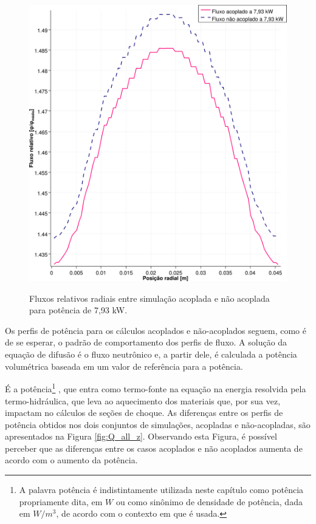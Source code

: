 \begin{figure}[htb]
  \caption{Fluxos relativos radiais entre simulação acoplada e não acoplada para
    potência de 7,93 kW.}
  \centering\includegraphics[scale=0.5]{figuras/Flux_rel_x_200_port.png}
  \label{fig:flux_x_200}
\end{figure}

Os perfis de potência para os cálculos acoplados e não-acoplados seguem, como
é de se esperar, o padrão de comportamento dos perfis de fluxo. A solução da
equação de difusão é o fluxo neutrônico e, a partir
dele, é calculada a potência volumétrica baseada em um valor de referência para
a potência.

É a potência\footnote{A palavra potência é indistintamente utilizada neste capítulo como potência
  propriamente dita, em $W$ ou como sinônimo de densidade de potência, dada em $W/m^3$, de acordo
  com o contexto em que é usada.}
, que entra como termo-fonte na equação na energia
resolvida pela termo-hidráulica, que leva ao aquecimento dos materiais que, por sua vez, impactam
no cálculos de seções de choque. As diferenças entre os perfis de potência obtidos nos dois conjuntos
de simulações, acopladas e não-acopladas, são apresentados na Figura \ref{fig:Q_all_z}.
Observando esta Figura,
é possível perceber que as diferenças entre os casos acoplados e
não acoplados aumenta de acordo com o aumento da potência.

